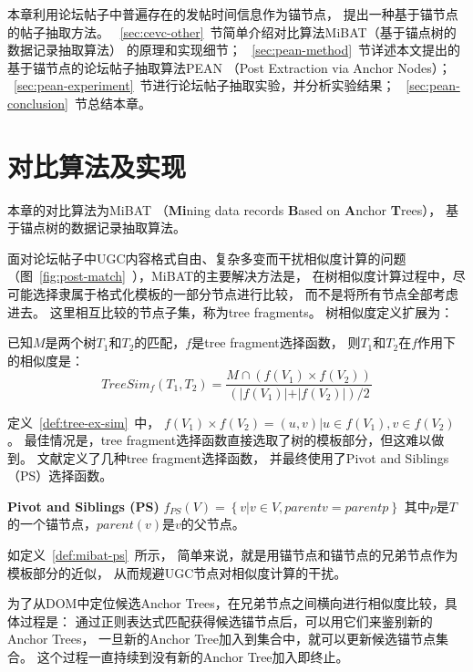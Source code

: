 本章利用论坛帖子中普遍存在的发帖时间信息作为锚节点，
提出一种基于锚节点的帖子抽取方法。
~\ref{sec:cevc-other}~节简单介绍对比算法MiBAT（基于锚点树的数据记录抽取算法）
的原理和实现细节；
~\ref{sec:pean-method}~节详述本文提出的基于锚节点的论坛帖子抽取算法PEAN
（Post Extraction via Anchor Nodes）；
~\ref{sec:pean-experiment}~节进行论坛帖子抽取实验，并分析实验结果；
~\ref{sec:pean-conclusion}~节总结本章。

\section{对比算法及实现}
\label{sec:pean-other}

本章的对比算法为MiBAT
（\textbf{Mi}ning data records 
\textbf{B}ased on \textbf{A}nchor \textbf{T}rees），
基于锚点树的数据记录抽取算法。

面对论坛帖子中UGC内容格式自由、复杂多变而干扰相似度计算的问题
（图~\ref{fig:post-match}~），MiBAT的主要解决方法是，
在树相似度计算过程中，尽可能选择隶属于格式化模板的一部分节点进行比较，
而不是将所有节点全部考虑进去。
这里相互比较的节点子集，称为tree fragments。
树相似度定义扩展为：

\begin{definition}
\label{def:tree-ex-sim}
已知$M$是两个树$T_1$和$T_2$的匹配，$f$是tree fragment选择函数，
则$T_1$和$T_2$在$f$作用下的相似度是：
\begin{equation}
TreeSim_f(T_1, T_2) = \frac{M \cap (f(V_1) \times f(V_2))}
{(\vert f(V_1) \vert + \vert f(V_2) \vert) / 2}
\end{equation}
\end{definition}

定义~\ref{def:tree-ex-sim}~中，
$f(V_1) \times f(V_2) = {(u,v) \vert u \in f(V_1), v \in f(V_2)}$。
最佳情况是，tree fragment选择函数直接选取了树的模板部分，但这难以做到。
文献\cite{song2010automatic}定义了几种tree fragment选择函数，
并最终使用了Pivot and Siblings（PS）选择函数。

\begin{definition}
\label{def:mibat-ps}
\textbf{Pivot and Siblings (PS)}
$f_{PS}(V) = \left\{ v \vert v \in V, parent{v} = parent{p} \right\}$
其中$p$是$T$的一个锚节点，$parent(v)$是$v$的父节点。
\end{definition}

如定义~\ref{def:mibat-ps}~所示，
简单来说，就是用锚节点和锚节点的兄弟节点作为模板部分的近似，
从而规避UGC节点对相似度计算的干扰。

为了从DOM中定位候选Anchor Trees，在兄弟节点之间横向进行相似度比较，具体过程是：
通过正则表达式匹配获得候选锚节点后，可以用它们来鉴别新的Anchor Trees，
一旦新的Anchor Tree加入到集合中，就可以更新候选锚节点集合。
这个过程一直持续到没有新的Anchor Tree加入即终止。


